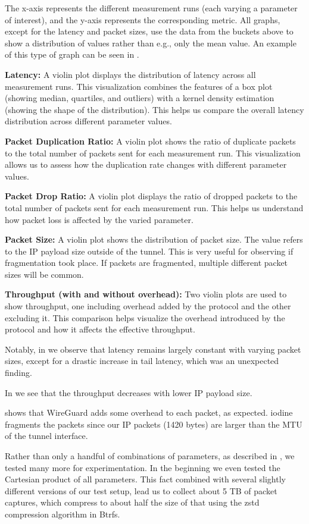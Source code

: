 The x-axis represents the different measurement runs (each varying a parameter of interest), and the y-axis represents the corresponding metric.
All graphs, except for the latency and packet sizes, use the data from the buckets above to show a distribution of values rather than e.g., only the mean value.
An example of this type of graph can be seen in .

\noindent\textbf{Latency:} A violin plot displays the distribution of latency across all measurement runs.
This visualization combines the features of a box plot (showing median, quartiles, and outliers) with a kernel density estimation (showing the shape of the distribution).
This helps us compare the overall latency distribution across different parameter values.

\noindent\textbf{Packet Duplication Ratio:} A violin plot shows the ratio of duplicate packets to the total number of packets sent for each measurement run.
This visualization allows us to assess how the duplication rate changes with different parameter values.

\noindent\textbf{Packet Drop Ratio:} A violin plot displays the ratio of dropped packets to the total number of packets sent for each measurement run.
This helps us understand how packet loss is affected by the varied parameter.

\noindent\textbf{Packet Size:} A violin plot shows the distribution of packet size.
The value refers to the IP payload size outside of the tunnel.
This is very useful for observing if fragmentation took place.
If packets are fragmented, multiple different packet sizes will be common.

\noindent\textbf{Throughput (with and without overhead):} Two violin plots are used to show throughput, one including overhead added by the protocol and the other excluding it.
This comparison helps visualize the overhead introduced by the protocol and how it affects the effective throughput.


Notably, in  we observe that latency remains largely constant with varying packet sizes, except for a drastic increase in tail latency, which was an unexpected finding.

In  we see that the throughput decreases with lower IP payload size.

 shows that WireGuard adds some overhead to each packet, as expected.
iodine fragments the packets since our IP packets (1420 bytes) are larger than the MTU of the tunnel interface.

Rather than only a handful of combinations of parameters, as described in , we tested many more for experimentation.
In the beginning we even tested the Cartesian product of all parameters.
This fact combined with several slightly different versions of our test setup, lead us to collect about 5 TB of packet captures, which compress to about half the size of that using the zstd compression algorithm in Btrfs.


